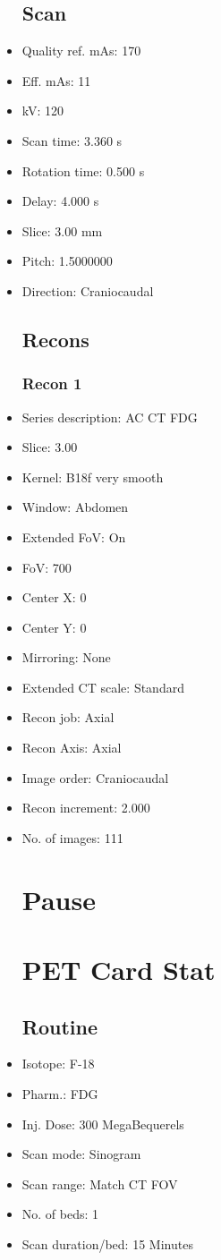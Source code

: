 \documentclass[12pt]{article}
\begin{document}
\begin{itemize}[noitemsep]
\subsection{Scan}
\item Quality ref. mAs: 170\item Eff. mAs: 11\item kV: 120\item Scan time: 3.360 s\item Rotation time: 0.500 s\item Delay: 4.000 s\item Slice: 3.00 mm\item Pitch: 1.5000000\item Direction: Craniocaudal\subsection{Recons}

\subsubsection{Recon 1}
\item Series description: AC CT FDG
\item Slice: 3.00
\item Kernel: B18f very smooth
\item Window: Abdomen
\item Extended FoV: On
\item FoV: 700
\item Center X: 0
\item Center Y: 0
\item Mirroring: None
\item Extended CT scale: Standard
\item Recon job: Axial
\item Recon Axis: Axial
\item Image order: Craniocaudal
\item Recon increment: 2.000
\item No. of images: 111
\section{Pause}
\section{PET Card Stat}\subsection{Routine}
\item Isotope: F-18
\item Pharm.: FDG
\item Inj. Dose: 300 MegaBequerels
\item Scan mode: Sinogram
\item Scan range: Match CT FOV
\item No. of beds: 1
\item Scan duration/bed: 15 Minutes

\end{itemize}
\end{document}
